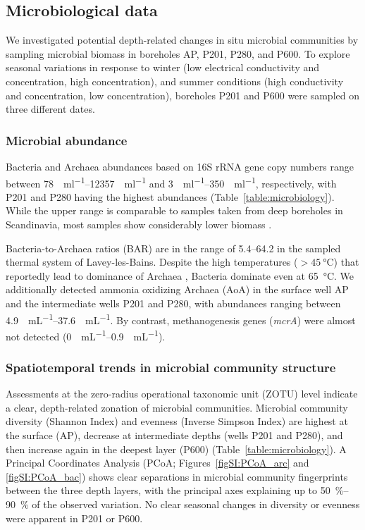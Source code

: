 \subsection{Microbiological data}
We investigated potential depth-related changes in situ microbial communities by sampling microbial biomass in boreholes AP, P201, P280, and P600.
To explore seasonal variations in response to winter (low electrical conductivity and  concentration, high  concentration), and summer conditions (high conductivity and  concentration, low  concentration), boreholes P201 and P600 were sampled on three different dates.



\subsubsection{Microbial abundance}
Bacteria and Archaea abundances based on 16S rRNA gene copy numbers range between \SIrange{78}{12357}{\copies\per\milli\litre} and \SIrange{3}{350}{\copies\per\milli\litre}, respectively, with P201 and P280 having the highest abundances (Table~\ref{table:microbiology}).
While the upper range is comparable to samples taken from deep boreholes in Scandinavia, most samples show considerably lower biomass \citep{itavaara2011characterization, bomberg2015active}.

Bacteria-to-Archaea ratios (BAR) are in the range of \SIrange{5.4}{64.2}{} in the sampled thermal system of Lavey-les-Bains.
Despite the high temperatures ($>\SI{45}{\celsius}$) that reportedly lead to dominance of Archaea \citep{lagostina2021interactions}, Bacteria dominate even at \SI{65}{\celsius}.
We additionally detected ammonia oxidizing Archaea (AoA) in the surface well AP and the intermediate wells P201 and P280, with abundances ranging between \SIrange{4.9}{37.6}{\copies\per\milli\liter}.
By contrast, methanogenesis genes (\textit{mcrA}) were almost not detected (\SIrange{0}{0.9}{\copies\per\milli\liter}).

\subsubsection{Spatiotemporal trends in microbial community structure}
Assessments at the zero-radius operational taxonomic unit (ZOTU) level indicate a clear, depth-related zonation of microbial communities.
Microbial community diversity (Shannon Index) and evenness (Inverse Simpson Index) are highest at the surface (AP), decrease at intermediate depths (wells P201 and P280), and then increase again in the deepest layer (P600) (Table~\ref{table:microbiology}).
A Principal Coordinates Analysis (PCoA; Figures~\ref{figSI:PCoA_arc} and \ref{figSI:PCoA_bac}) shows clear separations in microbial community fingerprints between the three depth layers, with the principal axes explaining up to \SIrange{50}{90}{\percent} of the observed variation.
No clear seasonal changes in diversity or evenness were apparent in P201 or P600.

